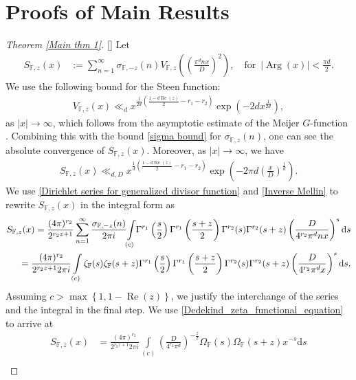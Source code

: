 \documentclass[12pt,reqno]{amsart}
\newcommand{\Arg}{\operatorname{Arg}}
\renewcommand{\Re}{\operatorname{Re}}
\renewcommand{\(}{\left\(}
\renewcommand{\)}{\right\)}
\renewcommand{\[}{\left\[}
\renewcommand{\]}{\right\]}
\numberwithin{equation}{section}
\theoremstyle{plain}
\begin{document}
\section{{\bf Proofs of Main Results}}
\begin{proof}[Theorem \rm{\ref{Main thm 1}}][]
Let
\begin{align}\label{Defn of S}
S_{\mathbb{F},z}(x) &:= \sum_{n=1}^{\infty}\sigma_{\mathbb{F}, -z}(n)V_{\mathbb{F},z}\left(\left(\frac{\pi^{d} n x}{D}\right)^2\right),  \quad \mathrm{for} \,\,\, |\Arg(x)| < \frac{\pi d}{2}.
\end{align}
We use the following bound for the Steen function:
\begin{align*}
V_{\mathbb{F},z}(x) \ll_d x^{\frac{1}{2d}\left(\frac{1-d\Re(z)}{2} - r_1 - r_2\right)}\exp{\left(-2dx^{\frac{1}{2d}}\right)},
\end{align*}
as $|x| \rightarrow \infty$, which follows from the asymptotic estimate of the Meijer $G$-function \cite[p.~180]{Luke}. 
Combining this with the bound \eqref{sigma bound} for $\sigma_{\mathbb{F},z}(n)$, one can see the absolute convergence of $S_{\mathbb{F},z}(x)$. Moreover, as $|x| \rightarrow \infty$, we have
\begin{align*}
S_{\mathbb{F},z}(x) \ll_{d, D} x^{\frac{1}{d}\left(\frac{1-d\Re(z)}{2} - r_1 - r_2\right)}\exp{\left(-2\pi d \left(\frac{x}{D}\right)^{\frac{1}{d}}\right)}.
\end{align*}
We use \eqref{Dirichlet series for generalized divisor function} and \eqref{Inverse Mellin} to rewrite $S_{\mathbb{F},z}(x)$ in the integral form as
\begin{align*}
S_{\mathbb{F},z}(x) = \frac{(4\pi)^{r_2}}{2^{r_2 z + 1}}\sum_{n=1}^{\infty}\frac{\sigma_{\mathbb{F}, -z}(n)}{2\pi i}{\displaystyle\int\limits_{(c)}\!\Gamma^{r_1}\left(\frac{s}{2}\right)\Gamma^{r_1}\left(\frac{s+z}{2}\right)\Gamma^{r_2}(s)\Gamma^{r_2}(s+z)\left(\frac{D}{4^{r_2}\pi^{d}nx}\right)^{s}\textrm{d}s} \notag \\
= \frac{(4\pi)^{r_2}}{2^{r_2 z + 1}2\pi i}\int\limits_{(c)}\zeta_{\mathbb{F}}(s)\zeta_{\mathbb{F}}(s+z)\Gamma^{r_1}\left(\frac{s}{2}\right)\Gamma^{r_1}\left(\frac{s+z}{2}\right)\Gamma^{r_2}(s)\Gamma^{r_2}(s+z)\left(\frac{D}{4^{r_2}\pi^{d} x}\right)^{s} \textrm{d}s.
\end{align*}
Assuming $c>\max\left\{1, 1-\Re(z)\right\}$, we justify the interchange of the series and the integral in the final step. We use \eqref{Dedekind_zeta_functional_equation} to arrive at
\begin{align}
S_{\mathbb{F},z}(x) &= \frac{(4\pi)^{r_2}}{2^{r_2 z + 1} 2\pi i}{\displaystyle\int\limits_{(c)}\left(\frac{D}{4^{r_2}\pi^d}\right)^{-\frac{z}{2}}\Omega_{\mathbb{F}}(s)\Omega_{\mathbb{F}}(s+z)x^{-s} \textrm{d}s} \nonumber \\

\end{align}
\end{proof}
\end{document}
